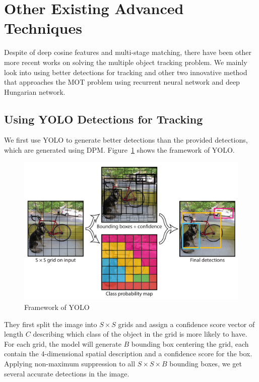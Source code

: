 \documentclass[conference]{IEEEtran}
\begin{document}
\section{Other Existing Advanced Techniques}
Despite of deep cosine features and multi-stage matching, there have been other more recent works on solving the multiple object tracking problem.
We mainly look into using better detections for tracking and other two innovative method that approaches the MOT problem using recurrent neural network and deep Hungarian network.

\subsection{Using YOLO Detections for Tracking}
We first use YOLO\cite{redmon2016you} to generate better detections than the provided detections, which are generated using DPM.
Figure~\ref{fig:yolo} shows the framework of YOLO.

\begin{figure}[h]
    \centering
    \includegraphics[width=\linewidth]{fig/yolo.png}
    \caption{Framework of YOLO\protect\footnotemark}
    \label{fig:yolo}
\end{figure}

They first split the image into $S \times S$ grids and assign a confidence score vector of length $C$ describing which class of the object in the grid is more likely to have.
For each grid, the model will generate $B$ bounding box centering the grid, each contain the 4-dimensional spatial description and a confidence score for the box.
Applying non-maximum suppression to all $S \times S \times B$ bounding boxes, we get several accurate detections in the image.
\end{document}

